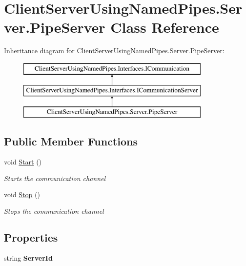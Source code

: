 \hypertarget{class_client_server_using_named_pipes_1_1_server_1_1_pipe_server}{}\section{Client\+Server\+Using\+Named\+Pipes.\+Server.\+Pipe\+Server Class Reference}
\label{class_client_server_using_named_pipes_1_1_server_1_1_pipe_server}
Inheritance diagram for Client\+Server\+Using\+Named\+Pipes.\+Server.\+Pipe\+Server\+:\begin{figure}[H]
\begin{center}
\leavevmode
\includegraphics[height=3.000000cm]{class_client_server_using_named_pipes_1_1_server_1_1_pipe_server}
\end{center}
\end{figure}
\subsection*{Public Member Functions}
\begin{DoxyCompactItemize}
\item 
void \hyperlink{class_client_server_using_named_pipes_1_1_server_1_1_pipe_server_a91d854612c235fa7da870e6a861f91c5}{Start} ()
\begin{DoxyCompactList}\small\item\em Starts the communication channel \end{DoxyCompactList}\item 
void \hyperlink{class_client_server_using_named_pipes_1_1_server_1_1_pipe_server_a37eb41a1b69ab108b9eb5745950b3ab9}{Stop} ()
\begin{DoxyCompactList}\small\item\em Stops the communication channel \end{DoxyCompactList}\end{DoxyCompactItemize}
\subsection*{Properties}
\begin{DoxyCompactItemize}
\item 
\mbox{\label{class_client_server_using_named_pipes_1_1_server_1_1_pipe_server_a3a8a8b1c5a1434d181390d875fab1945}} 
string {\bfseries Server\+Id}
\end{DoxyCompactItemize}
